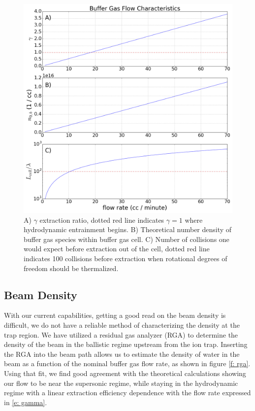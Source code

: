 \begin{figure} [H]
\centering
\includegraphics[width=1\textwidth]{images/CBGB_flow_characteristic.png}
\caption{A) $\gamma$ extraction ratio, dotted red line indicates $\gamma = 1$ where hydrodynamic entrainment begins. B) Theoretical number density of buffer gas species within buffer gas cell. C) Number of collisions one would expect before extraction out of the cell, dotted red line indicates 100 collisions before extraction when rotational degrees of freedom should be thermalized.}
\label{f: buffer_gas_flow}
\end{figure}

\subsection{Beam Density}

With our current capabilities, getting a good read on the beam density is difficult, we do not have a reliable method of characterizing the density at the trap region. We have utilized a residual gas analyzer (RGA) to determine the density of the beam in the ballistic regime upstream from the ion trap. Inserting the RGA into the beam path allows us to estimate the density of water in the beam as a function of the nominal buffer gas flow rate, as shown in figure \ref{f: rga}. Using that fit, we find good agreement with the theoretical calculations showing our flow to be near the supersonic regime, while staying in the hydrodynamic regime with a linear extraction efficiency dependence with the flow rate expressed in \ref{e: gamma}.

